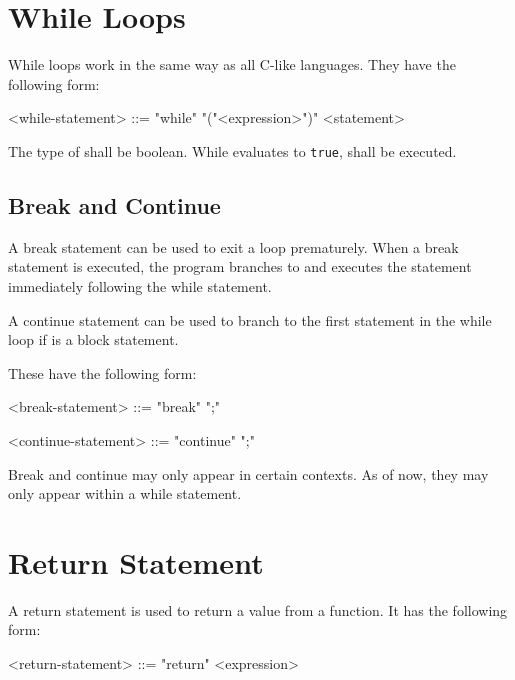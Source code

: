 \section{While Loops} \label{guide:while_stmt}

While loops work in the same way as all C-like languages. They have the following form:

\begin{minip}
\begin{grammar}
<while-statement> ::= "while" "("<expression>")" <statement>
\end{grammar}
\end{minip}

The type of  shall be boolean. While  evaluates to \texttt{true},  shall be executed. 

\subsection{Break and Continue} \label{guide:break_continue}

A break statement can be used to exit a loop prematurely. When a break statement is executed, the program branches to and executes the statement immediately following the while statement.

A continue statement can be used to branch to the first statement in the while loop if  is a block statement. 

These have the following form:

\begin{minip}
\begin{grammar}
<break-statement> ::= "break" ";"

<continue-statement> ::= "continue" ";"
\end{grammar}
\end{minip}

Break and continue may only appear in certain contexts. As of now, they may only appear within a while statement.

\section{Return Statement} \label{guide:return_stmt}

A return statement is used to return a value from a function. It has the following form:

\begin{minip}
\begin{grammar}
<return-statement> ::= "return" <expression>
\end{grammar}
\end{minip}

